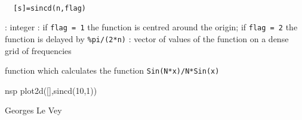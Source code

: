
\begin{mandesc}
   \\ %
\end{mandesc}
\begin{calling_sequence}
\begin{verbatim}
  [s]=sincd(n,flag)  
\end{verbatim}
\end{calling_sequence}
\begin{parameters}
  \begin{varlist}
    : integer
    : if \verb!flag = 1! the function is centred around the origin; if \verb!flag = 2! the function is delayed by \verb!%pi/(2*n)!
    : vector of values of the function on a dense grid of frequencies
  \end{varlist}
\end{parameters}
\begin{mandescription}
  function which calculates the function \verb!Sin(N*x)/N*Sin(x)!
\end{mandescription}
\begin{examples}
  \begin{mintednsp}{nsp}
    plot2d([],sincd(10,1)) 
  \end{mintednsp}
\end{examples}
\begin{authors}
  Georges Le Vey  
\end{authors}
